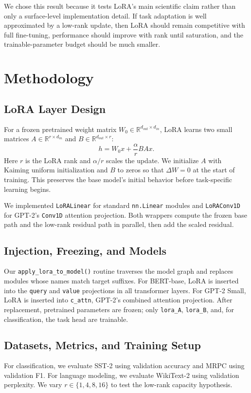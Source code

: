 \documentclass[11pt,twocolumn]{article}
\begin{document}
We chose this result because it tests LoRA's main scientific claim rather than only a surface-level implementation detail. If task adaptation is well approximated by a low-rank update, then LoRA should remain competitive with full fine-tuning, performance should improve with rank until saturation, and the trainable-parameter budget should be much smaller.

\section{Methodology}
\subsection{LoRA Layer Design}
For a frozen pretrained weight matrix $W_0\in\mathbb{R}^{d_{out}\times d_{in}}$, LoRA learns two small matrices $A\in\mathbb{R}^{r\times d_{in}}$ and $B\in\mathbb{R}^{d_{out}\times r}$:
\begin{equation}
  h = W_0x + \frac{\alpha}{r}BAx.
  \label{eq:lora}
\end{equation}
Here $r$ is the LoRA rank and $\alpha/r$ scales the update. We initialize $A$ with Kaiming uniform initialization and $B$ to zeros so that $\Delta W=0$ at the start of training. This preserves the base model's initial behavior before task-specific learning begins.

We implemented \texttt{LoRALinear} for standard \texttt{nn.Linear} modules and \texttt{LoRAConv1D} for GPT-2's \texttt{Conv1D} attention projection. Both wrappers compute the frozen base path and the low-rank residual path in parallel, then add the scaled residual.

\subsection{Injection, Freezing, and Models}
Our \texttt{apply\_lora\_to\_model()} routine traverses the model graph and replaces modules whose names match target suffixes. For BERT-base, LoRA is inserted into the \texttt{query} and \texttt{value} projections in all transformer layers. For GPT-2 Small, LoRA is inserted into \texttt{c\_attn}, GPT-2's combined attention projection. After replacement, pretrained parameters are frozen; only \texttt{lora\_A}, \texttt{lora\_B}, and, for classification, the task head are trainable.

\subsection{Datasets, Metrics, and Training Setup}
For classification, we evaluate SST-2 using validation accuracy and MRPC using validation F1. For language modeling, we evaluate WikiText-2 using validation perplexity. We vary $r\in\{1,4,8,16\}$ to test the low-rank capacity hypothesis.
\end{document}

